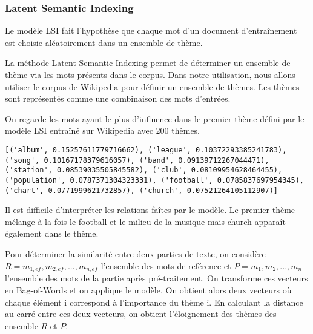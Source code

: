 \documentclass[12pt]{article}
\begin{document}
\subsubsection{Latent Semantic Indexing}
\noindent
Le modèle LSI fait l'hypothèse que chaque mot d'un document d'entraînement est choisie aléatoirement dans un ensemble de thème.%
\begin{comment}
\begin{equation}
    \label{equ:lsi}
    p(m,d) = p(d) \sum_{z \in Z} p(m|z)p(z|d)
\end{equation}

où Z définit l'ensemble des thèmes. C'est une matrice qui à chaque thème associe l'influence d'un mot dans ce thème. L'ensemble de thème optimal maximise la vraisemblance du corpus de document.
\end{comment}
La méthode Latent Semantic Indexing permet de déterminer un ensemble de thème via les mots présents dans le corpus. Dans notre utilisation, nous allons utiliser le corpus de Wikipedia pour définir un ensemble de thèmes. Les thèmes sont représentés comme une combinaison des mots d'entrées. 

\noindent
On regarde les mots ayant le plus d'influence dans le premier thème défini par le modèle LSI entraîné sur Wikipedia avec 200 thèmes.
\begin{verbatim}
[('album', 0.15257611779716662), ('league', 0.10372293385241783), 
('song', 0.10167178379616057), ('band', 0.09139712267044471), 
('station', 0.08539035505845582), ('club', 0.08109954628464455), 
('population', 0.0787371304323331), ('football', 0.0785837697954345),
('chart', 0.0771999621732857), ('church', 0.07521264105112907)]
\end{verbatim}
Il est difficile d'interpréter les relations faîtes par le modèle. Le premier thème mélange à la fois le football et le milieu de la musique mais church apparaît également dans le thème.

\noindent
Pour déterminer la similarité entre deux parties de texte, on considère $R={m_{1_ref},m_{2_ref},...,m_{n_ref}}$ l'ensemble des mots de reférence et $P={m_1,m_2,...,m_n}$ l'ensemble des mots de la partie après pré-traitement. On transforme ces vecteurs en Bag-of-Words et on applique le modèle. On obtient alors deux vecteurs où chaque élément i correspond à l'importance du thème i. En calculant la distance au carré entre ces deux vecteurs, on obtient l'éloignement des thèmes des ensemble $R$ et $P$.
\end{document}
